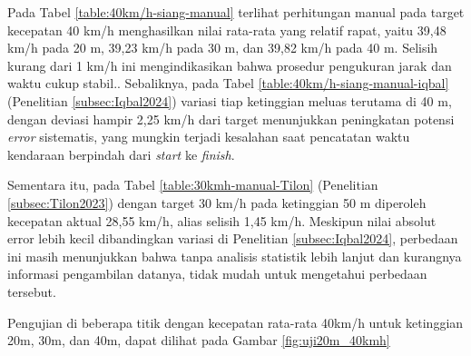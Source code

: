 Pada Tabel \ref{table:40km/h-siang-manual} terlihat perhitungan manual pada target kecepatan 40 km/h menghasilkan nilai rata-rata yang relatif rapat, yaitu 39,48 km/h pada 20 m, 39,23 km/h pada 30 m, dan 39,82 km/h pada 40 m. Selisih kurang dari 1 km/h ini mengindikasikan bahwa prosedur pengukuran jarak dan waktu cukup stabil.. Sebaliknya, pada Tabel \ref{table:40km/h-siang-manual-iqbal} (Penelitian \ref{subsec:Iqbal2024}) variasi tiap ketinggian meluas terutama di 40 m, dengan deviasi hampir 2,25 km/h dari target menunjukkan peningkatan potensi \emph{error} sistematis, yang mungkin terjadi kesalahan saat pencatatan waktu kendaraan berpindah dari \emph{start} ke \emph{finish}.

Sementara itu, pada Tabel \ref{table:30kmh-manual-Tilon} (Penelitian \ref{subsec:Tilon2023}) dengan target 30 km/h pada ketinggian 50 m diperoleh kecepatan aktual 28,55 km/h, alias selisih 1,45 km/h. Meskipun nilai absolut error lebih kecil dibandingkan variasi di Penelitian \ref{subsec:Iqbal2024}, perbedaan ini masih menunjukkan bahwa tanpa analisis statistik lebih lanjut dan kurangnya informasi pengambilan datanya, tidak mudah untuk mengetahui perbedaan tersebut.

Pengujian di beberapa titik dengan kecepatan rata-rata 40km/h untuk ketinggian 20m, 30m, dan 40m, dapat dilihat pada Gambar \ref{fig:uji20m_40kmh} 


